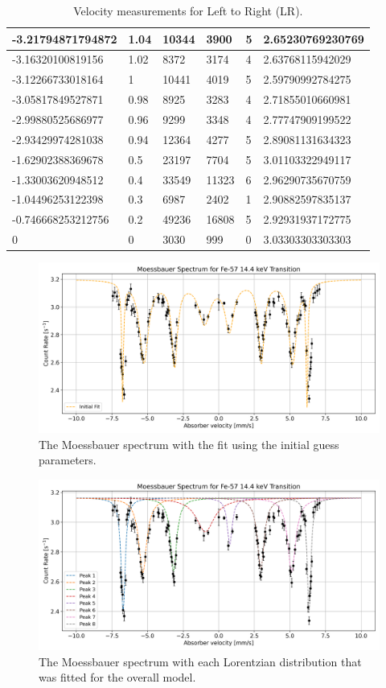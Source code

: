 \documentclass[a4paper]{report}
\numberwithin{equation}{section}
\begin{document}
\begin{table}[!ht]
\begin{tabular}{|l|l|l|l|l|l|}
        -3.21794871794872 & 1.04 & 10344 & 3900 & 5 & 2.65230769230769 \\ \hline
        -3.16320100819156 & 1.02 & 8372 & 3174 & 4 & 2.63768115942029 \\ \hline
        -3.12266733018164 & 1 & 10441 & 4019 & 5 & 2.59790992784275 \\ \hline
        -3.05817849527871 & 0.98 & 8925 & 3283 & 4 & 2.71855010660981 \\ \hline
        -2.99880525686977 & 0.96 & 9299 & 3348 & 4 & 2.77747909199522 \\ \hline
        -2.93429974281038 & 0.94 & 12364 & 4277 & 5 & 2.89081131634323 \\ \hline
        -1.62902388369678 & 0.5 & 23197 & 7704 & 5 & 3.01103322949117 \\ \hline
        -1.33003620948512 & 0.4 & 33549 & 11323 & 6 & 2.96290735670759 \\ \hline
        -1.04496253122398 & 0.3 & 6987 & 2402 & 1 & 2.90882597835137 \\ \hline
        -0.746668253212756 & 0.2 & 49236 & 16808 & 5 & 2.92931937172775 \\ \hline
        0 & 0 & 3030 & 999 & 0 & 3.03303303303303 \\ \hline
    \end{tabular}
    \caption{Velocity measurements for Left to Right (LR).}
\end{table}


\begin{figure}[htb!]
	\centering
	\includegraphics[width=0.8\columnwidth]{moess_spect_init.png}
	\caption{The Moessbauer spectrum with the fit using the initial guess parameters.}
	\label{fig:moess_spect_init}
\end{figure}

\begin{figure}[htb!]
	\centering
	\includegraphics[width=0.8\columnwidth]{moess_spect_comps.png}
	\caption{The Moessbauer spectrum with each Lorentzian distribution that was fitted for the overall model.}
	\label{fig:moess_spect_comps}
\end{figure}
\end{document}
